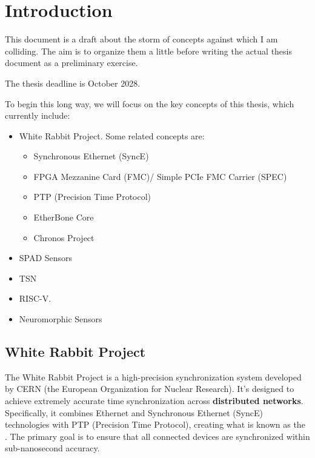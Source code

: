 \section{Introduction}

\label{intro}

This document is a draft about the storm of concepts against which I am colliding.
The aim is to organize them a little before writing the actual thesis document as a preliminary exercise.

\vspace{5 mm}

\noindent The thesis deadline is October 2028.

\vspace{5 mm}

\noindent To begin this long way, we will focus on the key concepts of this thesis, which currently include:

\begin{itemize}
\item White Rabbit Project. Some related concepts are:
    \begin{itemize}
    \item Synchronous Ethernet (SyncE) 
    \item FPGA Mezzanine Card (FMC)/ Simple PCIe FMC Carrier (SPEC)
    \item PTP (Precision Time Protocol) 
    \item EtherBone Core
    \item Chronos Project
    \end{itemize}
\item SPAD Sensors
\item TSN
\item RISC-V.
\item Neuromorphic Sensors
\end{itemize}

\subsection{White Rabbit Project}

The White Rabbit Project \cite{white-rabbit} is a high-precision synchronization system developed by CERN (the European Organization for Nuclear Research).
It’s designed to achieve extremely accurate time synchronization across \textbf{distributed networks}. 
Specifically, it combines Ethernet and Synchronous Ethernet (SyncE) technologies with PTP (Precision Time Protocol), creating what is known as the .
The primary goal is to ensure that all connected devices are synchronized within sub-nanosecond accuracy.


